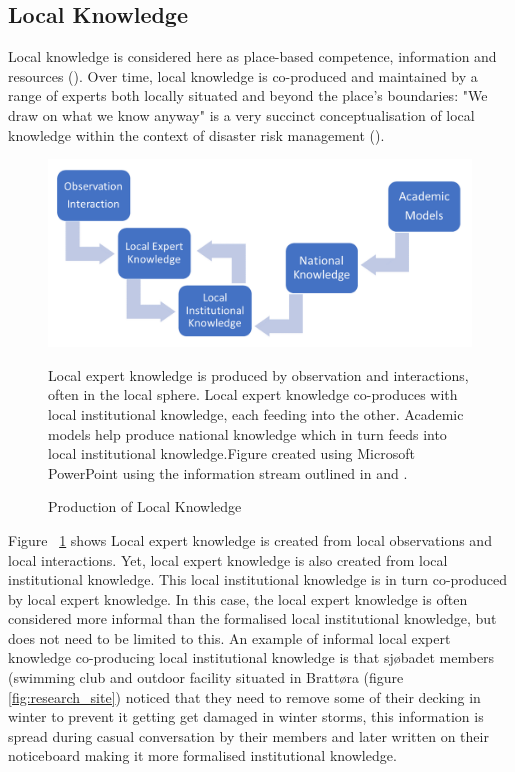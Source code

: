 \subsection{Local Knowledge}

Local knowledge is considered here as place-based competence, information and resources (\cite{setten_we_2019}). Over time,  local knowledge is co-produced and maintained by a range of experts both locally situated and beyond the place's boundaries: "We draw on what we know anyway" is a very succinct conceptualisation of local knowledge within the context of disaster risk management (\cite{setten_we_2019}). 

\begin{figure}[ht]
    \centering
    \includegraphics[width=1\textwidth]{fig_theory/local knowledge accumulation.png}
    \caption{Production of Local Knowledge }{ Local expert knowledge is produced by observation and interactions, often in the local sphere. Local expert knowledge co-produces with local institutional knowledge, each feeding into the other. Academic models help produce national knowledge which in turn feeds into local institutional knowledge.Figure created using Microsoft PowerPoint using the information stream outlined in \cite{setten_we_2019} and \cite{rod_integrated_2012}.}
    \label{fig:local_knowledge}
\end{figure}


Figure ~\ref{fig:local_knowledge} shows Local expert knowledge is created from local observations and local interactions. Yet, local expert knowledge is also created from local institutional knowledge. This local institutional knowledge is in turn co-produced by local expert knowledge. In this case, the local expert knowledge is often considered more informal than the formalised local institutional knowledge, but does not need to be limited to this. An example of informal local expert knowledge co-producing local institutional knowledge is that sjøbadet members (swimming club and outdoor facility situated in Brattøra (figure \ref{fig:research_site}) noticed that they need to remove some of their decking in winter to prevent it getting get damaged in winter storms, this information is spread during casual conversation by their members and later written on their noticeboard making it more formalised institutional knowledge. 
